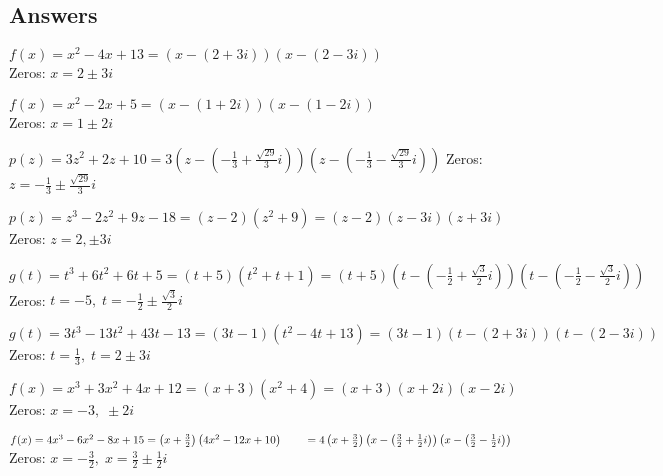 \clearpage

\subsection{Answers}

\startexenum

\begin{exenum}

\item $f(x) = x^2-4x+13 = (x-(2+3i)) (x-(2-3i))$ \\
Zeros: $x = 2 \pm 3i$ 
\item $f(x) = x^2 - 2x + 5 = (x-(1+2i))(x-(1-2i))$ \\ 
Zeros:  $x = 1 \pm 2i$

\item $p(z) = 3z^2 + 2z +10 = 3\left(z-\left(-\frac{1}{3} + \frac{\sqrt{29}}{3} i\right) \right) \left(z-\left(-\frac{1}{3} - \frac{\sqrt{29}}{3} i\right) \right)$
Zeros:  $z = -\frac{1}{3} \pm \frac{\sqrt{29}}{3} i$
\item $p(z) = z^3-2z^2+9z-18 = (z-2) \left(z^2+9\right) = (z-2)(z-3i)(z+3i)$\\
Zeros:  $z=2, \pm 3i$

\item $g(t) = t^{3} + 6t^{2} + 6t + 5 = (t + 5)(t^{2} + t + 1) = (t + 5) \left( t - \left( -\frac{1}{2} + \frac{\sqrt{3}}{2}i \right) \right) \left( t - \left(-\frac{1}{2} - \frac{\sqrt{3}}{2}i \right) \right)$ \\
Zeros: $t = -5, \;  t = -\frac{1}{2} \pm \frac{\sqrt{3}}{2}i $
\item $g(t) = 3t^{3} - 13t^{2} + 43t - 13 = (3t - 1)(t^{2} - 4t + 13) = (3t - 1)(t - (2 + 3i))(t - (2 - 3i))$\\
Zeros: $t = \frac{1}{3}, \; t = 2 \pm 3i$

\item $f(x) = x^3 + 3x^2 + 4x + 12 = (x+3) \left(x^2 + 4 \right) = (x+3)(x+2i)(x-2i)$ \\
Zeros:  $x = -3, \; \pm 2i$
\item $f(x) = 4x^3-6x^2-8x+15 = \left(x + \frac{3}{2} \right) \left(4x^2-12x+10\right) \\
 \phantom{f(x)} = 4 \left(x + \frac{3}{2} \right) \left(x - \left( \frac{3}{2} + \frac{1}{2}i  \right) \right) \left(x - \left( \frac{3}{2} - \frac{1}{2}i  \right) \right)$\\
Zeros:  $x = - \frac{3}{2}, \; x = \frac{3}{2} \pm \frac{1}{2}i$



\end{exenum}
